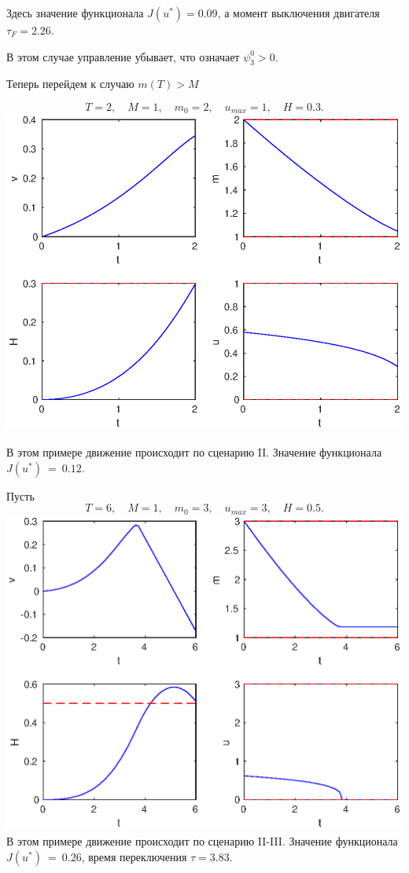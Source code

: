 \documentclass[16pt]{article}
\begin{document}
Здесь значение функционала $J(u^*) = 0.09$, а момент выключения двигателя $\tau_F = 2.26$.

В этом случае управление убывает, что означает $\psi_3^0 > 0$.

\newpage
Теперь перейдем к случаю $m(T) > M$

$$T = 2, \quad M = 1, \quad m_0 = 2, \quad u_{max} = 1, \quad H = 0.3.$$
\includegraphics[width=160mm]{2.eps}

В этом примере движение происходит по сценарию II. Значение функционала $J(u^*)~=~0.12$.

\newpage
Пусть
$$T = 6, \quad M = 1, \quad m_0 = 3, \quad u_{max} = 3, \quad H = 0.5.$$
\includegraphics[width=160mm]{23.eps}
В этом примере движение происходит по сценарию II-III. Значение функционала $J(u^*)~=~0.26$, время переключения
$\tau = 3.83$.
\end{document}
